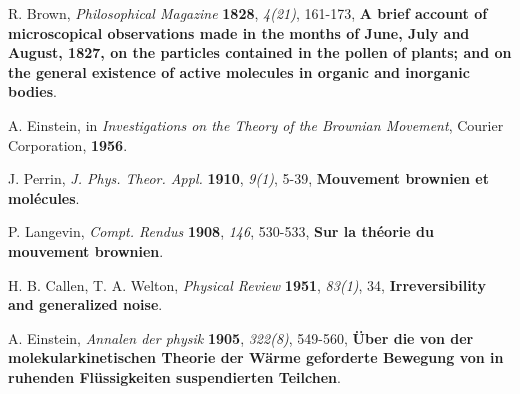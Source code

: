 \documentclass[fleqn,10pt]{InternshipReport-ENS-PSL}
\begin{document}
\begin{thebibliography}{99} %

R. Brown, {\it Philosophical Magazine} {\bf 1828}, {\it 4(21)}, 161-173, {\bf A brief account of microscopical observations made in the months of June, July and August, 1827, on the particles contained in the pollen of plants; and on the general existence of active molecules in organic and inorganic bodies}. 

A. Einstein, in {\it Investigations on the Theory of the Brownian Movement}, Courier Corporation, {\bf 1956}.

J. Perrin, {\it J. Phys. Theor. Appl.} {\bf 1910}, {\it 9(1)}, 5-39, {\bf Mouvement brownien et molécules}.

P. Langevin, {\it Compt. Rendus} {\bf 1908}, {\it 146}, 530-533, {\bf Sur la théorie du mouvement brownien}.

H. B. Callen, T. A. Welton, {\it Physical Review} {\bf 1951}, {\it 83(1)}, 34, {\bf Irreversibility and generalized noise}.

A. Einstein, {\it Annalen der physik} {\bf 1905}, {\it 322(8)}, 549-560, {\bf Über die von der molekularkinetischen Theorie der Wärme geforderte Bewegung von in ruhenden Flüssigkeiten suspendierten Teilchen}.


\end{thebibliography}
\end{document}
